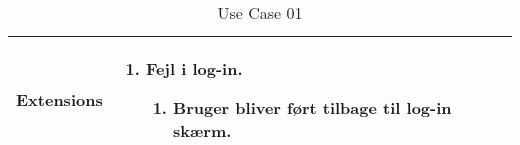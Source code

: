 \begin{table}[H]
\begin{tabular}{|l|p{10cm}|}
Extensions							& 

									\renewcommand{\labelenumi}{\Roman{enumi}:}
									\renewcommand{\labelenumii}{\alph{enumii})}
									\begin{enumerate}[topsep=0.0cm,leftmargin=0.5cm]
										\item Fejl i log-in.
											\begin{enumerate}[topsep=0cm, leftmargin=1cm]
												\item Bruger bliver ført tilbage til log-in skærm.
											\end{enumerate}
									\end{enumerate} \\\hline	

\end{tabular}
\caption{Use Case 01}
\label{tab:UC01}
\end{table}